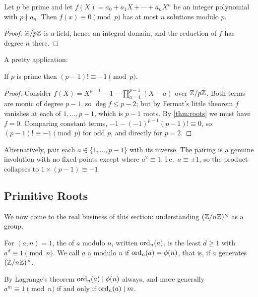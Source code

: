\documentclass[a4paper]{scrartcl}
\begin{document}
\begin{corollary}[Lagrange]\label{cor:lagrange}
	Let $p$ be prime and let $f(X) = a_0 + a_1 X + \cdots + a_n X^n$ be an integer polynomial with $p \nmid a_n$. Then $f(x) \equiv 0 \pmod p$ has at most $n$ solutions modulo $p$.
\end{corollary}
\begin{proof}
	$\mathbb{Z}/p\mathbb{Z}$ is a field, hence an integral domain, and the reduction of $f$ has degree $n$ there.
\end{proof}

A pretty application:

\begin{theorem}[Wilson]
	If $p$ is prime then $(p-1)! \equiv -1 \pmod p$.
\end{theorem}
\begin{proof}
	Consider $f(X) = X^{p-1} - 1 - \prod_{a=1}^{p-1}(X - a)$ over $\mathbb{Z}/p\mathbb{Z}$. Both terms are monic of degree $p - 1$, so $\deg f \leq p - 2$; but by Fermat's little theorem $f$ vanishes at each of $1, \dots, p-1$, which is $p - 1$ roots. By \autoref{thm:roots} we must have $f = 0$. Comparing constant terms, $-1 - (-1)^{p-1}(p-1)! \equiv 0$, so $(p-1)! \equiv -1 \pmod p$ for odd $p$, and directly for $p = 2$.
\end{proof}

\begin{remark}
	Alternatively, pair each $a \in \{1, \dots, p-1\}$ with its inverse. The pairing is a genuine involution with no fixed points except where $a^2 \equiv 1$, i.e.\ $a \equiv \pm 1$, so the product collapses to $1 \times (p-1) \equiv -1$.
\end{remark}

\subsection{Primitive Roots}

We now come to the real business of this section: understanding $(\mathbb{Z}/n\mathbb{Z})^\times$ as a group.

\begin{definition}
	For $(a, n) = 1$, the  of $a$ modulo $n$, written $\operatorname{ord}_n(a)$, is the least $d \geq 1$ with $a^d \equiv 1 \pmod n$. We call $a$ a  modulo $n$ if $\operatorname{ord}_n(a) = \phi(n)$, that is, if $a$ generates $(\mathbb{Z}/n\mathbb{Z})^\times$.
\end{definition}

By Lagrange's theorem $\operatorname{ord}_n(a) \mid \phi(n)$ always, and more generally $a^m \equiv 1 \pmod n$ if and only if $\operatorname{ord}_n(a) \mid m$.
\end{document}
